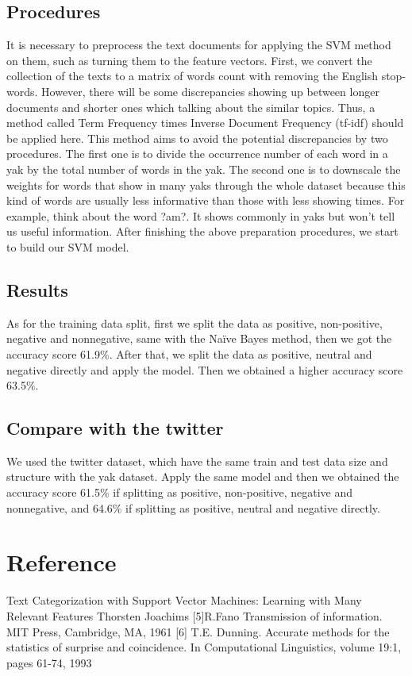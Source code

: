 \documentclass{article}
\begin{document}
    \subsection{Procedures}
      It is necessary to preprocess the text documents for applying the SVM method on them, such as turning them to the feature vectors. 
      First, we convert the collection of the texts to a matrix of words count with removing the English stop-words. However, there will be some discrepancies showing up between longer documents and shorter ones which talking about the similar topics. Thus, a method called Term Frequency times Inverse Document Frequency (tf-idf) should be applied here. This method aims to avoid the potential discrepancies by two procedures. The first one is to divide the occurrence number of each word in a yak by the total number of words in the yak. The second one is to downscale the weights for words that show in many yaks through the whole dataset because this kind of words are usually less informative than those with less showing times. For example, think about the word ?am?. It shows commonly in yaks but won't tell us useful information. After finishing the above preparation procedures, we start to build our SVM model.


    \subsection{Results}

      As for the training data split, first we split the data as positive, non-positive, negative and nonnegative, same with the Na\"ive Bayes method, then we got the accuracy score 61.9\%. After that, we split the data as positive, neutral and negative directly and apply the model. Then we obtained a higher accuracy score 63.5\%. 

    \subsection{Compare with the twitter}  
      We used the twitter dataset, which have the same train and test data size and structure with the yak dataset. Apply the same model and then we obtained the accuracy score 61.5\% if splitting as positive, non-positive, negative and nonnegative, and 64.6\% if splitting as positive, neutral and negative directly.
  \section{Reference}
  Text Categorization with Support Vector Machines: Learning with Many Relevant Features 
  Thorsten Joachims
  [5]R.Fano Transmission of information. MIT Press, Cambridge, MA, 1961
  [6] T.E. Dunning. Accurate methods for the statistics of surprise and coincidence. In Computational Linguistics, volume 19:1, pages 61-74, 1993
  
\end{document}
